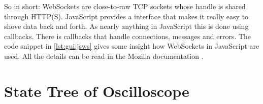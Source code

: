 So in  short: WebSockets are close-to-raw  TCP sockets whose handle  is shared
through HTTP(S).
JavaScript provides a  interface that makes it really easy  to shove data back
and forth.
As  nearly anything  in  JavaScript  this is  done  using callbacks. There  is
callbacks that  handle connections, messages  and errors. The code  snippet in
\ref{lst:gui:jsws}  gives  some  insight  how  WebSockets  in  JavaScript  are
used. All the details can be read in the Mozilla documentation \cite{moz:ws}.

%
%
\section{State Tree of Oscilloscope} %
\label{sec:app:gui:state_tree_of_scope}

